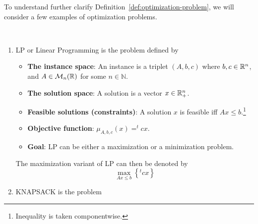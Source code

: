 To understand further clarify Definition~\ref{def:optimization-problem}, we will consider a few examples of optimization problems.

\begin{example}\ \\
    \begin{enumerate}
        \item \textsf{LP} or Linear Programming is the problem defined by
        \begin{itemize}
            \item \textbf{The instance space}: An instance is a triplet \((A, b, c)\) where \(b, c\in\mathbb{R}^n\), and \(A\in\mathcal{M}_n(\mathbb{R})\) for some \(n\in\mathbb{N}\).
            \item \textbf{The solution space}: A solution is a vector \(x\in\mathbb{R}_+^n\).
            \item \textbf{Feasible solutions (constraints)}: A solution \(x\) is feasible iff \(Ax\le b\).\footnote{Inequality is taken componentwise.}
            \item \textbf{Objective function}: \(\mu_{A,b,c}(x)=^tcx\).
            \item \textbf{Goal}: \textsf{LP} can be either a maximization or a minimization problem.
        \end{itemize}
        The maximization variant of \textsf{LP} can then be denoted by
        \[\max\limits_{Ax\le b}\left\{^tcx\right\}\]
        \item \textsf{KNAPSACK} is the problem 
    \end{enumerate}
\end{example}
